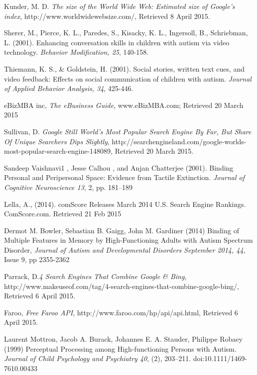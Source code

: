 \documentclass[a4paper, 10pt]{article}
\begin{document}
\begin{thebibliography}{100}
 Kunder, M. D. \textit{The size of the World Wide Web: Estimated size of Google's index}, http://www.worldwidewebsize.com/, Retrieved 8 April 2015.


Sherer, M., Pierce, K. L., Paredes, S., Kisacky, K. L., Ingersoll, B., Schriebman, L. (2001). Enhancing conversation skills in children with autism via video technology. \textit{Behavior Modification, 25}, 140-158.


Thiemann, K. S., \& Goldstein, H. (2001). Social stories, written text cues, and video feedback: Effects on social communication of children with autism. \textit{Journal of Applied Behavior Analysis, 34}, 425-446.

eBizMBA inc, \textit{The eBusiness Guide}, www.eBizMBA.com; Retrieved 20 March 2015

Sullivan, D. \textit{Google Still World’s Most Popular Search Engine By Far, But Share Of Unique Searchers Dips Slightly},  http://searchengineland.com/google-worlds-most-popular-search-engine-148089, Retrieved 20 March 2015.  

Sandeep Vaishnavi1 , Jesse Calhou , and Anjan Chatterjee (2001). Binding Personal and Peripersonal Space: Evidence from Tactile Extinction. \textit{Journal of Cognitive Neuroscience 13}, 2, pp. 181–189

Lella, A., (2014). comScore Releases March 2014 U.S. Search Engine Rankings. ComScore.com. Retrieved 21 Feb 2015

Dermot M. Bowler, Sebastian B. Gaigg, John M. Gardiner (2014) Binding of Multiple Features in Memory by High-Functioning Adults with Autism Spectrum Disorder, \textit{Journal of Autism and Developmental Disorders September 2014, 44}, Issue 9, pp 2355-2362

 Parrack, D.\textit{4 Search Engines That Combine Google \& Bing}, http://www.makeuseof.com/tag/4-search-engines-that-combine-google-bing/, Retrieved 6 April 2015.


Faroo, \textit{Free Faroo API}, http://www.faroo.com/hp/api/api.html, Retrieved 6 April 2015.

 Laurent Mottron, Jacob A. Burack, Johannes E. A. Stauder, Philippe Robaey (1999) Perceptual Processing among High-functioning Persons with Autism. \textit{Journal of Child Psychology and Psychiatry 40}, (2), 203–211. doi:10.1111/1469-7610.00433

\end{thebibliography}
\end{document}
